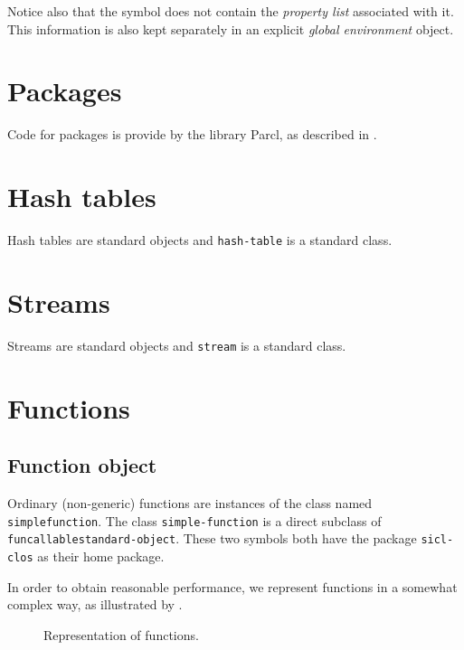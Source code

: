 Notice also that the symbol does not contain the \emph{property list}
associated with it.  This information is also kept separately in an
explicit \emph{global environment} object.

\section{Packages}

Code for packages is provide by the library Parcl, as described in
.

\section{Hash tables}

Hash tables are standard objects and \texttt{hash-table} is a standard
class. 

\section{Streams}

Streams are standard objects and \texttt{stream} is a standard class.

\section{Functions}
\label{sec-data-representation-functions}

\subsection{Function object}

Ordinary (non-generic) \sysname{} functions are instances of the class
named \texttt{simple\-function}.  The class \texttt{simple-function}
is a direct subclass of \texttt{funcallable\-standard-object}.  These
two symbols both have the package \texttt{sicl-clos} as their home
package.

In order to obtain reasonable performance, we represent functions in a
somewhat complex way, as illustrated by
.

\begin{figure}
\begin{center}
\end{center}
\caption{\label{fig-function-representation}
Representation of functions.}
\end{figure}

